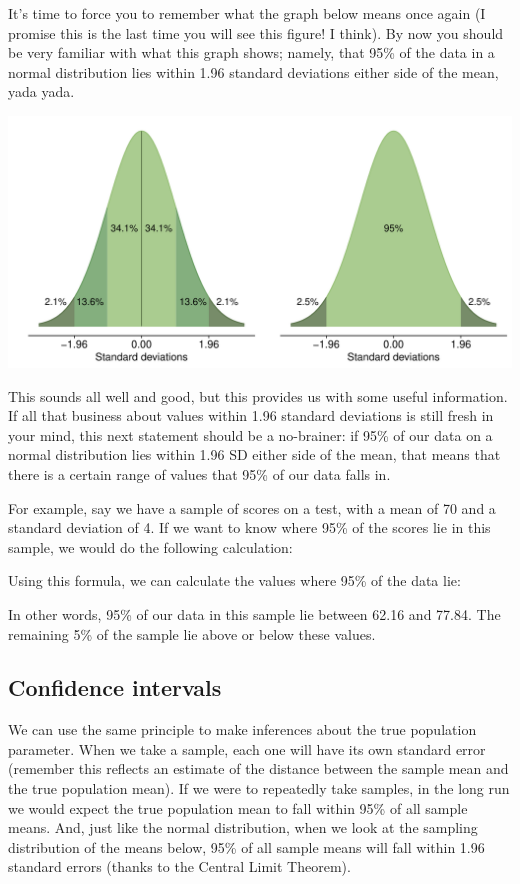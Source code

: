 \documentclass[
]{book}
\begin{document}
It's time to force you to remember what the graph below means once again (I promise this is the last time you will see this figure! I think). By now you should be very familiar with what this graph shows; namely, that 95\% of the data in a normal distribution lies within 1.96 standard deviations either side of the mean, yada yada.

\begin{center}\includegraphics{_main_files/figure-latex/unnamed-chunk-100-1} \end{center}

This sounds all well and good, but this provides us with some useful information. If all that business about values within 1.96 standard deviations is still fresh in your mind, this next statement should be a no-brainer: if 95\% of our data on a normal distribution lies within 1.96 SD either side of the mean, that means that there is a certain range of values that 95\% of our data falls in.

For example, say we have a sample of scores on a test, with a mean of 70 and a standard deviation of 4. If we want to know where 95\% of the scores lie in this sample, we would do the following calculation:

Using this formula, we can calculate the values where 95\% of the data lie:

In other words, 95\% of our data in this sample lie between 62.16 and 77.84. The remaining 5\% of the sample lie above or below these values.

\subsection{Confidence intervals}\label{confidence-intervals-1}

We can use the same principle to make inferences about the true population parameter. When we take a sample, each one will have its own standard error (remember this reflects an estimate of the distance between the sample mean and the true population mean). If we were to repeatedly take samples, in the long run we would expect the true population mean to fall within 95\% of all sample means. And, just like the normal distribution, when we look at the sampling distribution of the means below, 95\% of all sample means will fall within 1.96 standard errors (thanks to the Central Limit Theorem).
\end{document}
